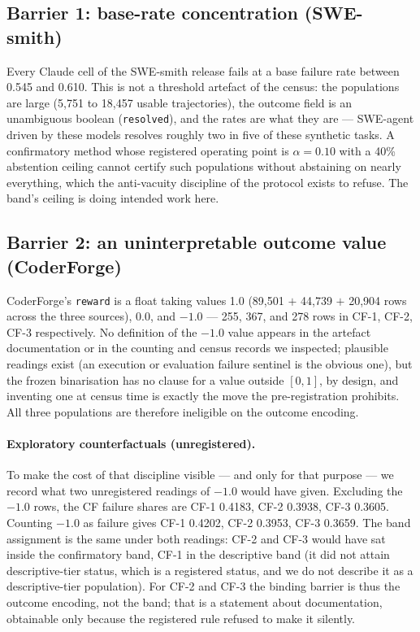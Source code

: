 \documentclass[11pt]{article}
\begin{document}
\subsection{Barrier 1: base-rate concentration (SWE-smith)}

Every Claude cell of the SWE-smith release fails at a base
failure rate between 0.545 and 0.610. This is not a threshold
artefact of the census: the populations are large (5{,}751 to
18{,}457 usable trajectories), the outcome field is an
unambiguous boolean (\texttt{resolved}), and the rates are what
they are --- SWE-agent driven by these models resolves roughly
two in five of these synthetic tasks. A confirmatory method
whose registered operating point is $\alpha = 0.10$ with a 40\%
abstention ceiling cannot certify such populations without
abstaining on nearly everything, which the anti-vacuity
discipline of the protocol exists to refuse. The band's ceiling
is doing intended work here.

\subsection{Barrier 2: an uninterpretable outcome value (CoderForge)}

CoderForge's \texttt{reward} is a float taking values 1.0
(89{,}501 $+$ 44{,}739 $+$ 20{,}904 rows across the three
sources), 0.0, and $-1.0$ --- 255, 367, and 278 rows in CF-1,
CF-2, CF-3 respectively. No definition of the $-1.0$ value
appears in the artefact documentation or in the counting and
census records we inspected; plausible readings exist (an
execution or evaluation failure sentinel is the obvious one),
but the frozen binarisation has no clause for a value outside
$[0,1]$, by design, and inventing one at census time is exactly
the move the pre-registration prohibits. All three populations
are therefore ineligible on the outcome encoding.

\paragraph{Exploratory counterfactuals (unregistered).} To make
the cost of that discipline visible --- and only for that
purpose --- we record what two unregistered readings of $-1.0$
would have given. Excluding the $-1.0$ rows, the CF failure
shares are CF-1 0.4183, CF-2 0.3938, CF-3 0.3605. Counting
$-1.0$ as failure gives CF-1 0.4202, CF-2 0.3953, CF-3 0.3659.
The band assignment is the same under both readings: CF-2 and
CF-3 would have sat inside the confirmatory band, CF-1 in the
descriptive band (it did not attain descriptive-tier status,
which is a registered status, and we do not describe it as a
descriptive-tier population). For CF-2 and CF-3 the binding
barrier is thus the outcome encoding, not the band; that is a
statement about documentation, obtainable only because the
registered rule refused to make it silently.
\end{document}
